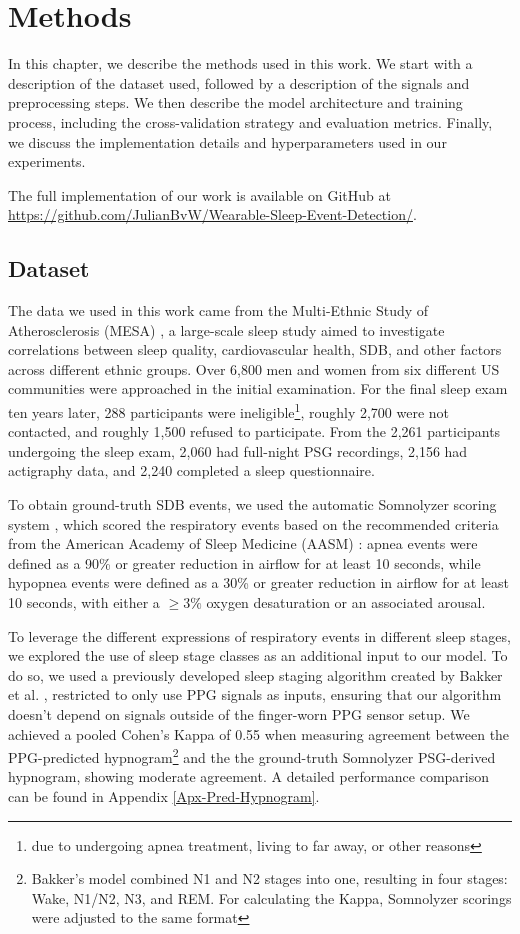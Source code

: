 \chapter{Methods \label{Chapter-Methods}}

In this chapter, we describe the methods used in this work. We start with a description of the dataset used, followed by a description of the signals and preprocessing steps. We then describe the model architecture and training process, including the cross-validation strategy and evaluation metrics. Finally, we discuss the implementation details and hyperparameters used in our experiments.

The full implementation of our work is available on GitHub at \url{https://github.com/JulianBvW/Wearable-Sleep-Event-Detection/}.

\section{Dataset}

The data we used in this work came from the Multi-Ethnic Study of Atherosclerosis (MESA) \cite{chen2015racial}, a large-scale sleep study aimed to investigate correlations between sleep quality, cardiovascular health, SDB, and other factors across different ethnic groups.
Over 6,800 men and women from six different US communities were approached in the initial examination. For the final sleep exam ten years later, 288 participants were ineligible\footnote{due to undergoing apnea treatment, living to far away, or other reasons}, roughly 2,700 were not contacted, and roughly 1,500 refused to participate. From the 2,261 participants undergoing the sleep exam, 2,060 had full-night PSG recordings, 2,156 had actigraphy data, and 2,240 completed a sleep questionnaire.

To obtain ground-truth SDB events, we used the automatic Somnolyzer scoring system \cite{anderer2022automated}, which scored the respiratory events based on the recommended criteria from the American Academy of Sleep Medicine (AASM) \cite{troester2023aasm}: apnea events were defined as a 90\% or greater reduction in airflow for at least 10 seconds, while hypopnea events were defined as a 30\% or greater reduction in airflow for at least 10 seconds, with either a $\geq 3\%$ oxygen desaturation or an associated arousal.

To leverage the different expressions of respiratory events in different sleep stages, we explored the use of sleep stage classes as an additional input to our model. To do so, we used a previously developed sleep staging algorithm created by Bakker et al. \cite{bakker2021estimating}, restricted to only use PPG signals as inputs, ensuring that our algorithm doesn't depend on signals outside of the finger-worn PPG sensor setup.
We achieved a pooled Cohen's Kappa of 0.55 when measuring agreement between the PPG-predicted hypnogram\footnote{Bakker's model combined N1 and N2 stages into one, resulting in four stages: Wake, N1/N2, N3, and REM. For calculating the Kappa, Somnolyzer scorings were adjusted to the same format} and the the ground-truth Somnolyzer PSG-derived hypnogram, showing moderate agreement. A detailed performance comparison can be found in Appendix \ref{Apx-Pred-Hypnogram}.

